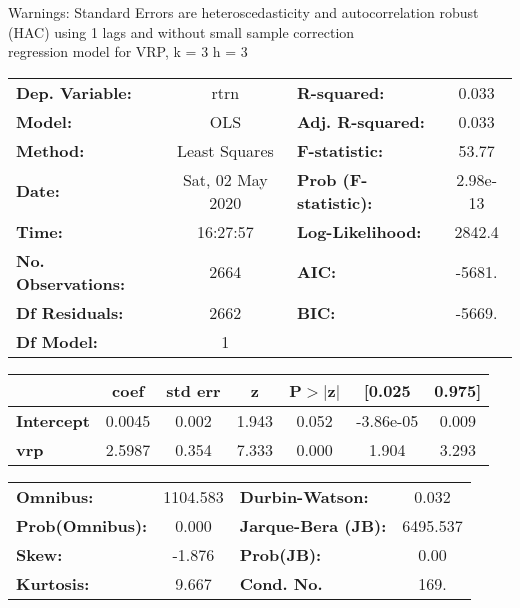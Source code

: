 Warnings: \newline
 [1] Standard Errors are heteroscedasticity and autocorrelation robust (HAC) using 1 lags and without small sample correction\\ 

regression model for VRP, k = 3 h = 3\begin{center}
\begin{tabular}{lclc}
\toprule
\textbf{Dep. Variable:}    &       rtrn       & \textbf{  R-squared:         } &     0.033   \\
\textbf{Model:}            &       OLS        & \textbf{  Adj. R-squared:    } &     0.033   \\
\textbf{Method:}           &  Least Squares   & \textbf{  F-statistic:       } &     53.77   \\
\textbf{Date:}             & Sat, 02 May 2020 & \textbf{  Prob (F-statistic):} &  2.98e-13   \\
\textbf{Time:}             &     16:27:57     & \textbf{  Log-Likelihood:    } &    2842.4   \\
\textbf{No. Observations:} &        2664      & \textbf{  AIC:               } &    -5681.   \\
\textbf{Df Residuals:}     &        2662      & \textbf{  BIC:               } &    -5669.   \\
\textbf{Df Model:}         &           1      & \textbf{                     } &             \\
\bottomrule
\end{tabular}
\begin{tabular}{lcccccc}
                   & \textbf{coef} & \textbf{std err} & \textbf{z} & \textbf{P$> |$z$|$} & \textbf{[0.025} & \textbf{0.975]}  \\
\midrule
\textbf{Intercept} &       0.0045  &        0.002     &     1.943  &         0.052        &    -3.86e-05    &        0.009     \\
\textbf{vrp}       &       2.5987  &        0.354     &     7.333  &         0.000        &        1.904    &        3.293     \\
\bottomrule
\end{tabular}
\begin{tabular}{lclc}
\textbf{Omnibus:}       & 1104.583 & \textbf{  Durbin-Watson:     } &    0.032  \\
\textbf{Prob(Omnibus):} &   0.000  & \textbf{  Jarque-Bera (JB):  } & 6495.537  \\
\textbf{Skew:}          &  -1.876  & \textbf{  Prob(JB):          } &     0.00  \\
\textbf{Kurtosis:}      &   9.667  & \textbf{  Cond. No.          } &     169.  \\
\bottomrule
\end{tabular}
\end{center}

